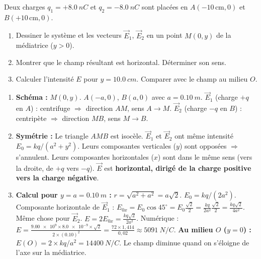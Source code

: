 \documentclass[11pt]{article}
\begin{document}
\begin{exercice}
Deux charges $q_1 = +\SI{8,0}{nC}$ et $q_2 = -\SI{8,0}{nC}$ sont placées en $A(-10\,\text{cm}, 0)$ et $B(+10\,\text{cm}, 0)$.
\begin{enumerate}
    \item Dessiner le système et les vecteurs $\vec{E}_1$, $\vec{E}_2$ en un point $M(0, y)$ de la médiatrice ($y>0$).
    \item Montrer que le champ résultant est horizontal. Déterminer son sens.
    \item Calculer l'intensité $E$ pour $y = \SI{10,0}{cm}$. Comparer avec le champ au milieu $O$.
\end{enumerate}
\end{exercice}

\begin{corrige}
\begin{enumerate}
    \item \textbf{Schéma :} $M(0, y)$. $A(-a,0)$, $B(a,0)$ avec $a=\SI{0,10}{m}$.
    $\vec{E}_1$ (charge $+q$ en $A$) : centrifuge $\Rightarrow$ direction $AM$, sens $A \to M$.
    $\vec{E}_2$ (charge $-q$ en $B$) : centripète $\Rightarrow$ direction $MB$, sens $M \to B$.
    \item \textbf{Symétrie :} Le triangle $AMB$ est isocèle. $\vec{E}_1$ et $\vec{E}_2$ ont même intensité $E_0 = kq/(a^2+y^2)$.
    Leurs composantes verticales ($y$) sont opposées $\Rightarrow$ s'annulent.
    Leurs composantes horizontales ($x$) sont dans le même sens (vers la droite, de $+q$ vers $-q$).
    $\vec{E}$ est \textbf{horizontal, dirigé de la charge positive vers la charge négative}.
    \item \textbf{Calcul pour $y = a = \SI{0,10}{m}$ :}
    $r = \sqrt{a^2+a^2} = a\sqrt{2}$.
    $E_0 = kq/(2a^2)$.
    Composante horizontale de $\vec{E}_1$ : $E_{0x} = E_0 \cos 45^\circ = E_0 \frac{\sqrt{2}}{2} = \frac{kq}{2a^2}\frac{\sqrt{2}}{2} = \frac{kq\sqrt{2}}{4a^2}$.
    Même chose pour $\vec{E}_2$.
    $E = 2 E_{0x} = \frac{kq\sqrt{2}}{2a^2}$.
    Numérique : $E = \frac{\num{9,00e9} \times \num{8,0e-9} \times \sqrt{2}}{2 \times (\num{0,10})^2} = \frac{72 \times 1,414}{0,02} \approx \SI{5091}{N/C}$.
    \textbf{Au milieu $O$ ($y=0$) :} $E(O) = 2 \times kq/a^2 = \SI{14400}{N/C}$.
    Le champ diminue quand on s'éloigne de l'axe sur la médiatrice.
\end{enumerate}
\end{corrige}
\end{document}
